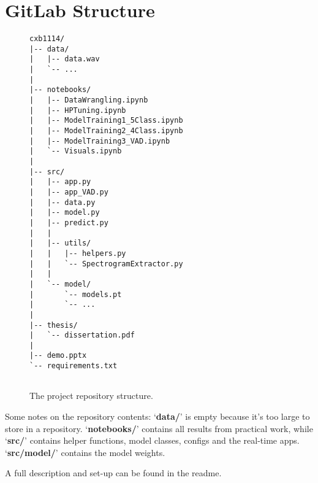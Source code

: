 \chapter{GitLab Structure}
\begin{figure}[H]
\centering
\begin{verbatim}
cxb1114/
|-- data/
|   |-- data.wav
|   `-- ...
|
|-- notebooks/
|   |-- DataWrangling.ipynb
|   |-- HPTuning.ipynb
|   |-- ModelTraining1_5Class.ipynb
|   |-- ModelTraining2_4Class.ipynb
|   |-- ModelTraining3_VAD.ipynb
|   `-- Visuals.ipynb
|
|-- src/
|   |-- app.py
|   |-- app_VAD.py
|   |-- data.py
|   |-- model.py
|   |-- predict.py
|   |
|   |-- utils/
|   |   |-- helpers.py
|   |   `-- SpectrogramExtractor.py
|   |
|   `-- model/
|       `-- models.pt
|       `-- ...
|
|-- thesis/
|   `-- dissertation.pdf
|
|-- demo.pptx
`-- requirements.txt


\end{verbatim}
\caption{The project repository structure.}
\end{figure}

Some notes on the repository contents: `\textbf{data/}' is empty because it's too large to store in a repository. `\textbf{notebooks/}' contains all results from practical work, while `\textbf{src/}' contains helper functions, model classes, configs and the real-time apps. `\textbf{src/model/}' contains the model weights.\newline

\noindent A full description and set-up can be found in the readme.
